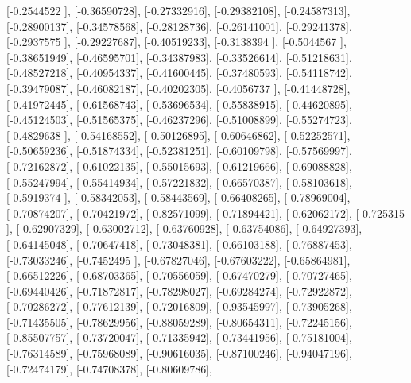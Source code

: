 \documentclass{article}
\begin{document}
       [-0.2544522 ],
       [-0.36590728],
       [-0.27332916],
       [-0.29382108],
       [-0.24587313],
       [-0.28900137],
       [-0.34578568],
       [-0.28128736],
       [-0.26141001],
       [-0.29241378],
       [-0.2937575 ],
       [-0.29227687],
       [-0.40519233],
       [-0.3138394 ],
       [-0.5044567 ],
       [-0.38651949],
       [-0.46595701],
       [-0.34387983],
       [-0.33526614],
       [-0.51218631],
       [-0.48527218],
       [-0.40954337],
       [-0.41600445],
       [-0.37480593],
       [-0.54118742],
       [-0.39479087],
       [-0.46082187],
       [-0.40202305],
       [-0.4056737 ],
       [-0.41448728],
       [-0.41972445],
       [-0.61568743],
       [-0.53696534],
       [-0.55838915],
       [-0.44620895],
       [-0.45124503],
       [-0.51565375],
       [-0.46237296],
       [-0.51008899],
       [-0.55274723],
       [-0.4829638 ],
       [-0.54168552],
       [-0.50126895],
       [-0.60646862],
       [-0.52252571],
       [-0.50659236],
       [-0.51874334],
       [-0.52381251],
       [-0.60109798],
       [-0.57569997],
       [-0.72162872],
       [-0.61022135],
       [-0.55015693],
       [-0.61219666],
       [-0.69088828],
       [-0.55247994],
       [-0.55414934],
       [-0.57221832],
       [-0.66570387],
       [-0.58103618],
       [-0.5919374 ],
       [-0.58342053],
       [-0.58443569],
       [-0.66408265],
       [-0.78969004],
       [-0.70874207],
       [-0.70421972],
       [-0.82571099],
       [-0.71894421],
       [-0.62062172],
       [-0.725315  ],
       [-0.62907329],
       [-0.63002712],
       [-0.63760928],
       [-0.63754086],
       [-0.64927393],
       [-0.64145048],
       [-0.70647418],
       [-0.73048381],
       [-0.66103188],
       [-0.76887453],
       [-0.73033246],
       [-0.7452495 ],
       [-0.67827046],
       [-0.67603222],
       [-0.65864981],
       [-0.66512226],
       [-0.68703365],
       [-0.70556059],
       [-0.67470279],
       [-0.70727465],
       [-0.69440426],
       [-0.71872817],
       [-0.78298027],
       [-0.69284274],
       [-0.72922872],
       [-0.70286272],
       [-0.77612139],
       [-0.72016809],
       [-0.93545997],
       [-0.73905268],
       [-0.71435505],
       [-0.78629956],
       [-0.88059289],
       [-0.80654311],
       [-0.72245156],
       [-0.85507757],
       [-0.73720047],
       [-0.71335942],
       [-0.73441956],
       [-0.75181004],
       [-0.76314589],
       [-0.75968089],
       [-0.90616035],
       [-0.87100246],
       [-0.94047196],
       [-0.72474179],
       [-0.74708378],
       [-0.80609786],
\end{document}
